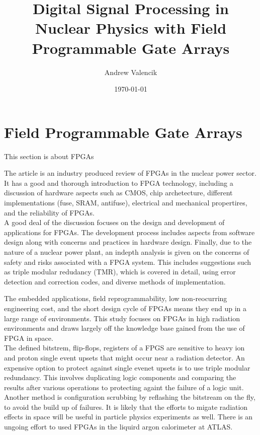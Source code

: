 \documentclass[12pt]{article}
\begin{document}
\title{Digital Signal Processing in Nuclear Physics with Field Programmable Gate Arrays}

\author{Andrew Valencik}

\date{\today}

\maketitle


\section{Field Programmable Gate Arrays}
This section is about FPGAs
\\[20pt]

{\large\textbf{\cite{currentState}}}

The article is an industry produced review of FPGAs in the nuclear power sector. It has a good and thorough introduction to FPGA technology, including a discussion of hardware aspects such as CMOS, chip archetecture, different implementations (fuse, SRAM, antifuse), electrical and mechanical propertires, and the reliability of FPGAs.
\\
A good deal of the discussion focuses on the design and development of applications for FPGAs. The development process includes aspects from software design along with concerns and practices in hardware design. Finally, due to the nature of a nuclear power plant, an indepth analysis is given on the concerns of safety and risks associated with a FPGA system. This includes suggestions such as triple modular redudancy (TMR), which is covered in detail, using error detection and correction codes, and diverse methods of implementation.
\\[20pt]

{\large\textbf{\cite{Wirthlin}}}

The embedded applications, field reprogrammability, low non-reocurring engineering cost, and the short design cycle of FPGAs means they end up in a large range of environments. This study focuses on FPGAs in high radiation environments and draws largely off the knowledge base gained from the use of FPGA in space. 
\\
The defined bitstrem, flip-flops, registers of a FPGS are sensitive to heavy ion and proton single event upsets that might occur near a radiation detector. An expensive option to protect against single evenet upsets is to use triple modular redundancy. This involves duplicating logic components and comparing the results after various operations to protecting againt the failure of a logic unit. Another method is configuration scrubbing by reflashing the bitstream on the fly, to avoid the build up of failures. It is likely that the efforts to migate radiation effects in space will be useful in particle physics experiments as well. There is an ungoing effort to used FPGAs in the liquird argon calorimeter at ATLAS. 
\\[20pt]
\end{document}
